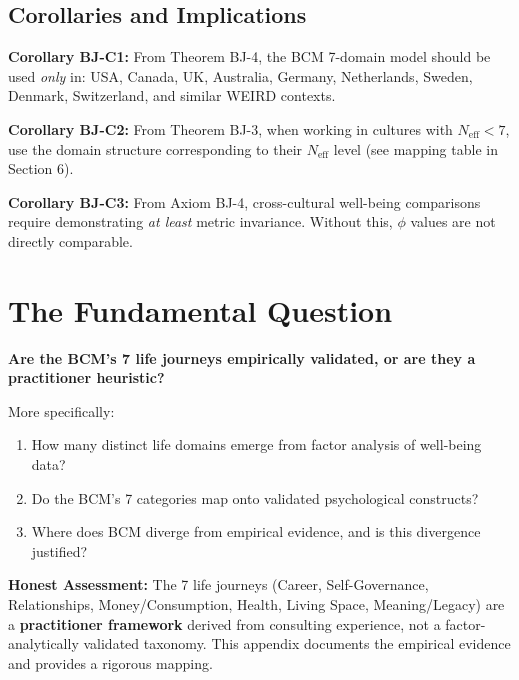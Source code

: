 \subsection{Corollaries and Implications}

\textbf{Corollary BJ-C1:} From Theorem BJ-4, the BCM 7-domain model should be used \textit{only} in:
USA, Canada, UK, Australia, Germany, Netherlands, Sweden, Denmark, Switzerland, and similar WEIRD contexts.

\textbf{Corollary BJ-C2:} From Theorem BJ-3, when working in cultures with $N_{\text{eff}} < 7$,
use the domain structure corresponding to their $N_{\text{eff}}$ level (see mapping table in Section 6).

\textbf{Corollary BJ-C3:} From Axiom BJ-4, cross-cultural well-being comparisons require
demonstrating \textit{at least} metric invariance. Without this, $\phi$ values are not directly comparable.


\section{The Fundamental Question}
\label{sec:bj-fundamental}

\begin{tcolorbox}[colback=red!5!white, colframe=red!75!black, title=Central Question]
\textbf{Are the BCM's 7 life journeys empirically validated, or are they a practitioner heuristic?}

More specifically:
\begin{enumerate}[nosep]
\item How many distinct life domains emerge from factor analysis of well-being data?
\item Do the BCM's 7 categories map onto validated psychological constructs?
\item Where does BCM diverge from empirical evidence, and is this divergence justified?
\end{enumerate}
\end{tcolorbox}

\textbf{Honest Assessment:} The 7 life journeys (Career, Self-Governance, Relationships, Money/Consumption, Health, Living Space, Meaning/Legacy) are a \textbf{practitioner framework} derived from consulting experience, not a factor-analytically validated taxonomy. This appendix documents the empirical evidence and provides a rigorous mapping.

